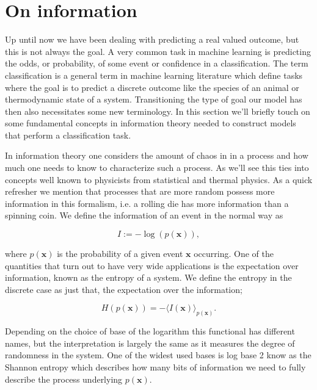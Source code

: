 
\section{On information}\label{sec:information}

Up until now we have been dealing with predicting a real valued outcome, but this is not always the goal. A very common task in machine learning is predicting the odds, or probability, of some event or confidence in a classification. The term classification is a general term in machine learning literature which define tasks where the goal is to predict a discrete outcome like the species of an animal or thermodynamic state of a system. Transitioning the type of goal our model has then also necessitates some new terminology. In this section we'll briefly touch on some fundamental concepts in information theory needed to construct models that perform a classification task.

In information theory one considers the amount of chaos in in a process and how much one needs to know to characterize such a process. As we'll see this ties into concepts well known to physicists from statistical and thermal physics. As a quick refresher we mention that processes that are more random possess more information in this formalism, i.e. a rolling die has more information than a spinning coin. We define the information of an event in the normal way as 

\begin{equation}
I := -\log(p(\mathbf{x})),
\end{equation} 

\noindent where $p(\mathbf{x})$ is the probability of a given event $\mathbf{x}$ occurring. One of the quantities that turn out to have very wide applications is the expectation over information, known as the entropy of a system. We define the entropy in the discrete case as just that, the expectation over the information;

\begin{equation}
H(p(\mathbf{x})) = -\langle I(\mathbf{x}) \rangle_{p(\mathbf{x})}.
\end{equation}

\noindent Depending on the choice of base of the logarithm this functional has different names, but the interpretation is largely the same as it measures the degree of randomness in the system. One of the widest used bases is log base 2 know as the Shannon entropy which describes how many bits of information we need to fully describe the process underlying $p(\mathbf{x})$. 

